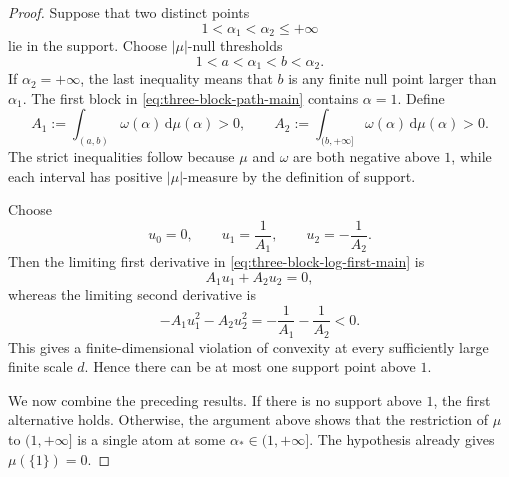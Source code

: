 \documentclass[aps,pra,11pt,onecolumn,nofootinbib,tightenlines]{revtex4-2}
\theoremstyle{definition}
\begin{document}
\begin{proof}
Suppose that two distinct points
\begin{equation}
 1<\alpha_1<\alpha_2\leq+\infty
 \label{eq:two-support-points}
\end{equation}
lie in the support. Choose $|\mu|$-null thresholds
\begin{equation}
 1<a<\alpha_1<b<\alpha_2.
 \label{eq:two-support-thresholds}
\end{equation}
If $\alpha_2=+\infty$, the last inequality means that $b$ is any finite null point larger than $\alpha_1$. The first block in \eqref{eq:three-block-path-main} contains $\alpha=1$. Define
\begin{equation}
 A_1:=\int_{(a,b)}\omega(\alpha)\,\mathrm d\mu(\alpha)>0,
 \qquad
 A_2:=\int_{(b,+\infty]}\omega(\alpha)\,\mathrm d\mu(\alpha)>0.
 \label{eq:two-positive-tail-coefficients}
\end{equation}
The strict inequalities follow because $\mu$ and $\omega$ are both negative above $1$, while each interval has positive $|\mu|$-measure by the definition of support.

Choose
\begin{equation}
 u_0=0,
 \qquad
 u_1=\frac1{A_1},
 \qquad
 u_2=-\frac1{A_2}.
 \label{eq:two-tail-velocities}
\end{equation}
Then the limiting first derivative in \eqref{eq:three-block-log-first-main} is
\begin{equation}
 A_1u_1+A_2u_2=0,
 \label{eq:two-tail-first-zero}
\end{equation}
whereas the limiting second derivative is
\begin{equation}
 -A_1u_1^2-A_2u_2^2
 =-\frac1{A_1}-\frac1{A_2}<0.
 \label{eq:two-tail-second-negative}
\end{equation}
This gives a finite-dimensional violation of convexity at every sufficiently large finite scale $d$. Hence there can be at most one support point above $1$.

We now combine the preceding results. If there is no support above $1$, the first alternative holds. Otherwise, the argument above shows that the restriction of $\mu$ to $(1,+\infty]$ is a single atom at some $\alpha_*\in(1,+\infty]$. The hypothesis already gives $\mu(\{1\})=0$.


\end{proof}
\end{document}
